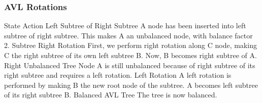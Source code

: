 \documentclass{beamer}
\begin{document}
\begin{frame}
\frametitle{AVL Rotations}
\large

State	Action
Left Subtree of Right Subtree	A node has been inserted into left subtree of right subtree. This makes A an unbalanced node, with balance factor 2.
Subtree Right Rotation	First, we perform right rotation along C node, making C the right subtree of its own left subtree B. Now, B becomes right subtree of A.
Right Unbalanced Tree	Node A is still unbalanced because of right subtree of its right subtree and requires a left rotation.
Left Rotation	A left rotation is performed by making B the new root node of the subtree. A becomes left subtree of its right subtree B.
Balanced AVL Tree	The tree is now balanced.
\end{frame}
\end{document}
